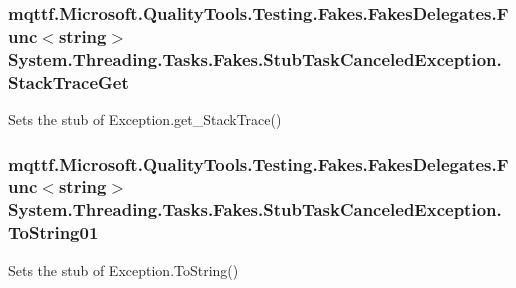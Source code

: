 \hypertarget{class_system_1_1_threading_1_1_tasks_1_1_fakes_1_1_stub_task_canceled_exception_aa1a11667d7450384daaba5c8741e4e57}{
\subsubsection[{Stack\-Trace\-Get}]{\setlength{\rightskip}{0pt plus 5cm}mqttf.\-Microsoft.\-Quality\-Tools.\-Testing.\-Fakes.\-Fakes\-Delegates.\-Func$<$string$>$ System.\-Threading.\-Tasks.\-Fakes.\-Stub\-Task\-Canceled\-Exception.\-Stack\-Trace\-Get}}\label{class_system_1_1_threading_1_1_tasks_1_1_fakes_1_1_stub_task_canceled_exception_aa1a11667d7450384daaba5c8741e4e57}


Sets the stub of Exception.\-get\-\_\-\-Stack\-Trace()

\hypertarget{class_system_1_1_threading_1_1_tasks_1_1_fakes_1_1_stub_task_canceled_exception_a15e689e06e310228ace1cd7bc6ac5006}{
\subsubsection[{To\-String01}]{\setlength{\rightskip}{0pt plus 5cm}mqttf.\-Microsoft.\-Quality\-Tools.\-Testing.\-Fakes.\-Fakes\-Delegates.\-Func$<$string$>$ System.\-Threading.\-Tasks.\-Fakes.\-Stub\-Task\-Canceled\-Exception.\-To\-String01}}\label{class_system_1_1_threading_1_1_tasks_1_1_fakes_1_1_stub_task_canceled_exception_a15e689e06e310228ace1cd7bc6ac5006}


Sets the stub of Exception.\-To\-String()



